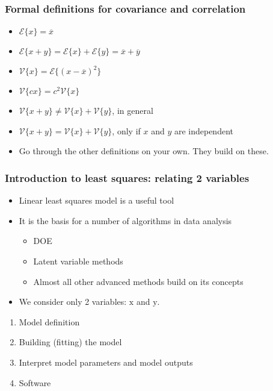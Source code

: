 \begin{frame}\frametitle{Formal definitions for covariance and correlation}
	\begin{itemize}
		\item	$\mathcal{E}\{x\} = \overline{x}$
		\item	$\mathcal{E}\{x+y\} = \mathcal{E}\{x\} + \mathcal{E}\{y\} = \overline{x} + \overline{y}$
		\item	$\mathcal{V}\{x\} = \mathcal{E}\{(x-\overline{x})^2\}$
		\item	$\mathcal{V}\{cx\} = c^2\mathcal{V}\{x\}$
		\item	$\mathcal{V}\{x+y\} \neq \mathcal{V}\{x\} + \mathcal{V}\{y\}$, in general
		\item	$\mathcal{V}\{x+y\} = \mathcal{V}\{x\} + \mathcal{V}\{y\}$, only if $x$ and $y$ are independent
		\item	Go through the other definitions on your own. They build on these.
	\end{itemize}
\end{frame}

\begin{frame}\frametitle{Introduction to least squares: relating 2 variables}
	\begin{itemize}
		\item	Linear least squares model is a useful tool
		\item	It is the basis for a number of algorithms in data analysis
		\begin{itemize}
			\item	DOE
			\item	Latent variable methods
			\item	Almost all other advanced methods build on its concepts
		\end{itemize}
	\end{itemize}
	\begin{itemize}
		\item	We consider only 2 variables: $\mathrm{x}$ and $\mathrm{y}$.
	\end{itemize}
	\begin{enumerate}
		\item	Model definition
		\item	Building (fitting) the model
		\item	Interpret model parameters and model outputs
		\item	Software
	\end{enumerate}
\end{frame}


